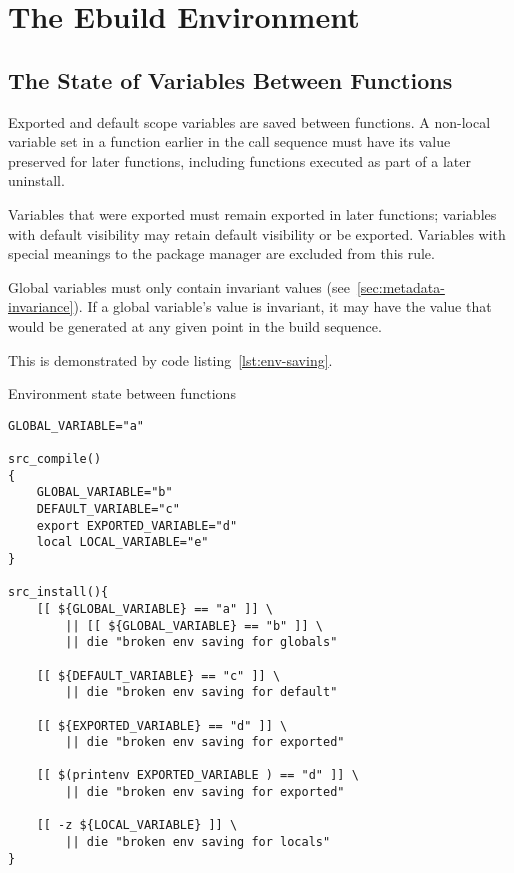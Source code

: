 \chapter{The Ebuild Environment}



\section{The State of Variables Between Functions}
\label{sec:ebuild-env-state}

Exported and default scope variables are saved between functions. A non-local variable set in a
function earlier in the call sequence must have its value preserved for later functions, including
functions executed as part of a later uninstall.


Variables that were exported must remain exported in later functions; variables with default
visibility may retain default visibility or be exported. Variables with special meanings to the
package manager are excluded from this rule.

Global variables must only contain invariant values (see~\ref{sec:metadata-invariance}). If a global
variable's value is invariant, it may have the value that would be generated at any given point
in the build sequence.

This is demonstrated by code listing~\ref{lst:env-saving}.

\begin{listing}
\caption{Environment state between functions} \label{lst:env-saving}
\begin{verbatim}
GLOBAL_VARIABLE="a"

src_compile()
{
    GLOBAL_VARIABLE="b"
    DEFAULT_VARIABLE="c"
    export EXPORTED_VARIABLE="d"
    local LOCAL_VARIABLE="e"
}

src_install(){
    [[ ${GLOBAL_VARIABLE} == "a" ]] \
        || [[ ${GLOBAL_VARIABLE} == "b" ]] \
        || die "broken env saving for globals"

    [[ ${DEFAULT_VARIABLE} == "c" ]] \
        || die "broken env saving for default"

    [[ ${EXPORTED_VARIABLE} == "d" ]] \
        || die "broken env saving for exported"

    [[ $(printenv EXPORTED_VARIABLE ) == "d" ]] \
        || die "broken env saving for exported"

    [[ -z ${LOCAL_VARIABLE} ]] \
        || die "broken env saving for locals"
}
\end{verbatim}
\end{listing}

